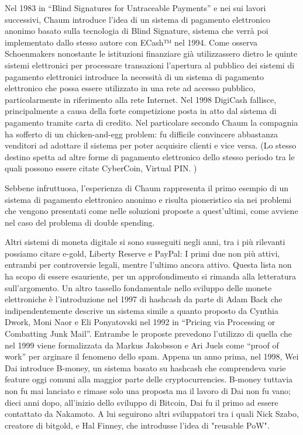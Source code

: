 Nel 1983 in “Blind Signatures for Untraceable Payments” e nei sui lavori successivi, Chaum introduce l’idea di un sistema di pagamento elettronico anonimo basato sulla tecnologia di Blind Signature, sistema che verrà poi implementato dallo stesso autore con ECash™ nel 1994. Come osserva Schoenmakers nonostante le istituzioni finanziare già utilizzassero dietro le quinte sistemi elettronici per processare transazioni l’apertura al pubblico dei sistemi di pagamento elettronici introduce la necessità di un sistema di pagamento elettronico che possa essere utilizzato in una rete ad accesso pubblico, particolarmente in riferimento alla rete Internet. Nel 1998 DigiCash fallisce, principalmente a causa della forte competizione posta in atto dal sistema di pagamento tramite carta di credito. Nel particolare secondo Chaum la compagnia ha sofferto di un chicken-and-egg problem: fu difficile convincere abbastanza venditori  ad adottare il sistema per  poter acquisire clienti e vice versa. (Lo stesso destino spetta ad altre forme di pagamento elettronico dello stesso periodo tra le quali possono essere citate CyberCoin, Virtual PIN. ) 


Sebbene infruttuosa, l’esperienza di Chaum rappresenta il primo esempio di un sistema di pagamento elettronico anonimo e risulta pioneristico sia nei problemi che vengono presentati come nelle soluzioni proposte a quest’ultimi, come avviene nel caso del problema di double spending. 


Altri sistemi di moneta digitale si sono susseguiti negli anni, tra i più rilevanti possiamo citare e-gold, Liberty Reserve e PayPal: I primi due non più attivi, entrambi per controversie legali, mentre l’ultimo ancora attivo. Questa lista non ha scopo di essere esauriente, per un approfondimento si rimanda alla letteratura sull’argomento.
Un altro tassello fondamentale nello sviluppo delle monete elettroniche è l’introduzione nel 1997 di hashcash da parte di Adam Back che indipendentemente descrive un sistema simile a quanto proposto da Cynthia Dwork,  Moni Naor e Eli Ponyatovski nel 1992 in “Pricing via Processing or Combatting Junk Mail”. Entrambe le proposte prevedono l’utilizzo di quella che nel 1999 viene formalizzata da  Markus Jakobsson e Ari Juels come “proof of work” per arginare il fenomeno dello spam. Appena un anno prima, nel 1998, Wei Dai introduce B-money, un sistema basato su hashcash che comprendeva varie feature oggi comuni alla maggior parte delle cryptocurrencies. B-money tuttavia non fu mai lanciato e rimase solo una proposta ma il lavoro di Dai non fu vano; dieci anni dopo, all'inizio dello sviluppo di Bitcoin, Dai fu il primo ad essere contattato da Nakamoto. A lui seguirono altri sviluppatori tra i quali Nick Szabo, creatore di bitgold, e Hal Finney, che introdusse l'idea di "reusable PoW". 


